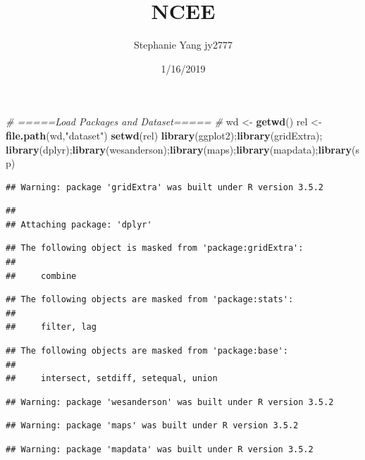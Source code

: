 \documentclass[]{article}
\title{NCEE}
\author{Stephanie Yang jy2777}
\date{1/16/2019}
\newenvironment{Shaded}{\begin{snugshade}}{\end{snugshade}}
\newcommand{\KeywordTok}[1]{\textcolor[rgb]{0.13,0.29,0.53}{\textbf{#1}}}
\newcommand{\StringTok}[1]{\textcolor[rgb]{0.31,0.60,0.02}{#1}}
\newcommand{\CommentTok}[1]{\textcolor[rgb]{0.56,0.35,0.01}{\textit{#1}}}
\newcommand{\NormalTok}[1]{#1}
\begin{document}
\maketitle

\begin{Shaded}
\begin{Highlighting}[]
\CommentTok{# =====Load Packages and Dataset===== #}
\NormalTok{wd <-}\StringTok{ }\KeywordTok{getwd}\NormalTok{()}
\NormalTok{rel <-}\StringTok{ }\KeywordTok{file.path}\NormalTok{(wd,}\StringTok{"dataset"}\NormalTok{)}
\KeywordTok{setwd}\NormalTok{(rel)}
\KeywordTok{library}\NormalTok{(ggplot2);}\KeywordTok{library}\NormalTok{(gridExtra); }\KeywordTok{library}\NormalTok{(dplyr);}\KeywordTok{library}\NormalTok{(wesanderson);}\KeywordTok{library}\NormalTok{(maps);}\KeywordTok{library}\NormalTok{(mapdata);}\KeywordTok{library}\NormalTok{(sp)}
\end{Highlighting}
\end{Shaded}

\begin{verbatim}
## Warning: package 'gridExtra' was built under R version 3.5.2
\end{verbatim}

\begin{verbatim}
## 
## Attaching package: 'dplyr'
\end{verbatim}

\begin{verbatim}
## The following object is masked from 'package:gridExtra':
## 
##     combine
\end{verbatim}

\begin{verbatim}
## The following objects are masked from 'package:stats':
## 
##     filter, lag
\end{verbatim}

\begin{verbatim}
## The following objects are masked from 'package:base':
## 
##     intersect, setdiff, setequal, union
\end{verbatim}

\begin{verbatim}
## Warning: package 'wesanderson' was built under R version 3.5.2
\end{verbatim}

\begin{verbatim}
## Warning: package 'maps' was built under R version 3.5.2
\end{verbatim}

\begin{verbatim}
## Warning: package 'mapdata' was built under R version 3.5.2
\end{verbatim}
\end{document}
